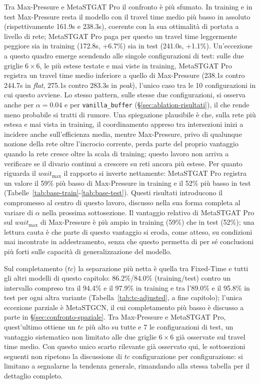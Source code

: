 Tra Max-Pressure e MetaSTGAT Pro il confronto è più sfumato. In training e in test Max-Pressure
resta il modello con il travel time medio più basso in assoluto (rispettivamente 161.9s e 238.3s),
coerente con la sua ottimalità di portata a livello di rete;
MetaSTGAT Pro paga per questo un travel time leggermente peggiore sia in training (172.8s, +6.7\%) sia in test (241.0s, +1.1\%).
Un'eccezione a questo quadro emerge scendendo alle singole configurazioni
di test: sulle due griglie $6\times6$, le più estese testate e mai viste
in training, MetaSTGAT Pro registra un travel time medio inferiore a
quello di Max-Pressure (238.1s contro 244.7s in \emph{flat}, 275.1s contro
283.3s in \emph{peak}), l'unico caso tra le 10 configurazioni in cui questo
avviene. Lo stesso pattern, sulle stesse due configurazioni, si osserva
anche per $\alpha=0.04$ e per \texttt{vanilla\_buffer}
(§\ref{sec:ablation-risultati}), il che rende meno probabile si tratti di
rumore. Una spiegazione plausibile è che, sulla rete più estesa e mai
vista in training, il coordinamento appreso tra intersezioni inizi a
incidere anche sull'efficienza media, mentre Max-Pressure, privo di
qualunque nozione della rete oltre l'incrocio corrente, perda parte del
proprio vantaggio quando la rete cresce oltre la scala di training; questo
lavoro non arriva a verificare se il divario continui a crescere su reti
ancora più estese.
Per quanto riguarda il $wait_{\max}$ il rapporto si inverte nettamente:
MetaSTGAT Pro registra un valore il 59\% più basso di Max-Pressure in training e il 52\% più basso in test
(Tabelle~\ref{tab:base-train}-\ref{tab:base-test}).
Questi risultati introducono il compromesso al centro di questo lavoro, discusso nella sua forma
completa al variare di $\alpha$ nella prossima sottosezione.
Il vantaggio relativo di MetaSTGAT Pro sul $wait_{\max}$ di Max-Pressure è
più ampio in training (59\%) che in test (52\%); una lettura cauta è che
parte di questo vantaggio si eroda, come atteso, su condizioni mai
incontrate in addestramento, senza che questo permetta di per sé
conclusioni più forti sulle capacità di generalizzazione del modello.

Sul completamento ($tc$) la separazione più netta è quella tra Fixed-Time
e tutti gli altri modelli di questo capitolo: 86.2\%/84.0\%
(training/test) contro un intervallo compreso tra il 94.4\% e il 97.9\% in
training e tra l'89.0\% e il 95.8\% in test per ogni altra variante
(Tabella~\ref{tab:tc-adjusted}, a fine capitolo); l'unica
eccezione parziale è MetaSTGCN, il cui completamento più basso è discusso
a parte in §\ref{sec:confronto-spaziale}. Tra Max-Pressure e MetaSTGAT
Pro, quest'ultimo ottiene un $tc$ più alto su tutte e 7 le configurazioni
di test, un vantaggio sistematico non limitato alle due griglie
$6\times6$ già osservate sul travel time medio. Con questo unico scarto
rilevante già osservato qui, le sottosezioni seguenti non ripetono la
discussione di $tc$ configurazione per configurazione: si limitano a
segnalarne la tendenza generale, rimandando alla stessa tabella per il
dettaglio completo.

